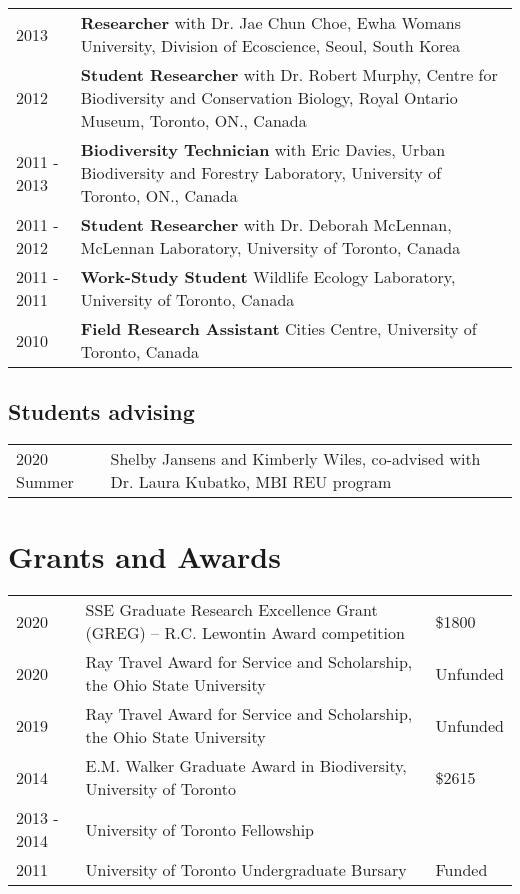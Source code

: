 \documentclass[11pt]{article}
\begin{document}
\begin{longtable}{p{}  p{}}
2013 &	\textbf{Researcher} with Dr. Jae Chun Choe, Ewha Womans University, Division of Ecoscience, Seoul, South Korea\\
2012 &	\textbf{Student Researcher} with Dr. Robert Murphy, Centre for Biodiversity and Conservation Biology, Royal Ontario Museum, Toronto, ON., Canada\\
2011 - 2013 &	\textbf{Biodiversity Technician} with Eric Davies, Urban Biodiversity and Forestry Laboratory, University of Toronto, ON., Canada\\
2011 - 2012 &	\textbf{Student Researcher} with Dr. Deborah McLennan, McLennan Laboratory, University of Toronto, Canada\\
2011 - 2011&	\textbf{Work-Study Student} Wildlife Ecology Laboratory, University of Toronto, Canada\\
2010 & \textbf{Field Research Assistant} Cities Centre, University of Toronto, Canada\\

\end{longtable}

\subsection*{Students advising}

\begin{longtable}{p{}  p{}}

2020 Summer&Shelby Jansens and Kimberly Wiles, co-advised with Dr. Laura Kubatko, MBI REU program\\

\end{longtable}

\hspace{0pt}
\section*{Grants and Awards}

\begin{longtable}{p{}  p{} p{}}

2020 &	SSE Graduate Research Excellence Grant (GREG) – R.C. Lewontin Award competition & \$1800\\
2020 &	Ray Travel Award for Service and Scholarship, the Ohio State University & Unfunded\\
2019 &	Ray Travel Award for Service and Scholarship, the Ohio State University & Unfunded\\
2014 &	E.M. Walker Graduate Award in Biodiversity, University of Toronto & \$2615\\
2013 - 2014 & University of Toronto Fellowship &  \\
2011 &	University of Toronto Undergraduate Bursary & Funded\\

\end{longtable}
\end{document}
